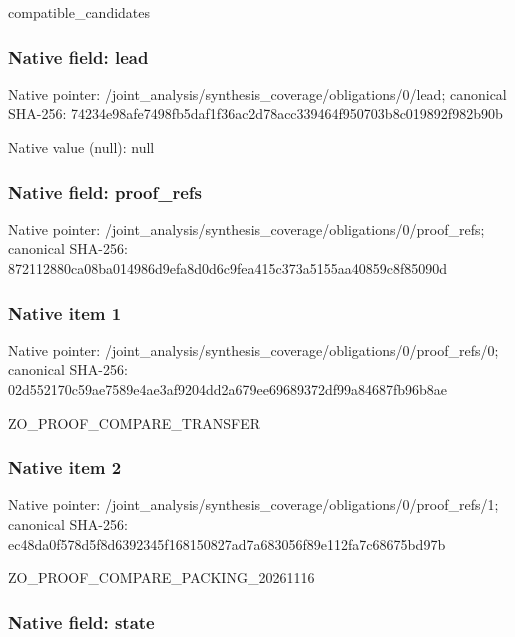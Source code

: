 \documentclass[10pt,a4paper]{article}
\begin{document}
compatible\_candidates


\subsubsection{Native field: lead}


Native pointer: /joint\_analysis/synthesi\allowbreak{}s\_coverage/obligations/0\allowbreak{}/lead; canonical SHA-256: 74234e98afe7498fb5daf1f3\allowbreak{}6ac2d78acc339464f950703b\allowbreak{}8c019892f982b90b



Native value (null): null



\subsubsection{Native field: proof\_refs}


Native pointer: /joint\_analysis/synthesi\allowbreak{}s\_coverage/obligations/0\allowbreak{}/proof\_refs; canonical SHA-256: 872112880ca08ba014986d9e\allowbreak{}fa8d0d6c9fea415c373a5155\allowbreak{}aa40859c8f85090d



\subsubsection{Native item 1}


Native pointer: /joint\_analysis/synthesi\allowbreak{}s\_coverage/obligations/0\allowbreak{}/proof\_refs/0; canonical SHA-256: 02d552170c59ae7589e4ae3a\allowbreak{}f9204dd2a679ee69689372df\allowbreak{}99a84687fb96b8ae


ZO\_PROOF\_COMPARE\_TRANSFER


\subsubsection{Native item 2}


Native pointer: /joint\_analysis/synthesi\allowbreak{}s\_coverage/obligations/0\allowbreak{}/proof\_refs/1; canonical SHA-256: ec48da0f578d5f8d6392345f\allowbreak{}168150827ad7a683056f89e1\allowbreak{}12fa7c68675bd97b


ZO\_PROOF\_COMPARE\_PACKING\_20261116


\subsubsection{Native field: state}
\end{document}
